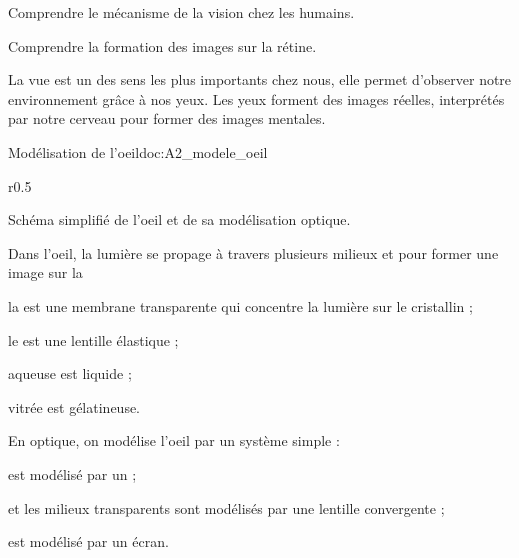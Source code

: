 \tetePremStssVisi
{}

\begin{objectifs}
  \item Comprendre le mécanisme de la vision chez les humains.
  \item Comprendre la formation des images sur la rétine.
\end{objectifs}

\begin{contexte}
  La vue est un des sens les plus importants chez nous, elle permet d'observer notre environnement grâce à nos yeux.
  Les yeux forment des images réelles, interprétés par notre cerveau pour former des images mentales.
  
\end{contexte}

\begin{doc}{Modélisation de l'oeil}{doc:A2_modele_oeil}  
  \begin{wrapfigure}{r}{0.5\linewidth}
    \vspace*{-30pt}
    \centering

    \vspace*{-12pt}
    \small{Schéma simplifié de l'oeil et de sa modélisation optique.}
  \end{wrapfigure}

  Dans l'oeil, la lumière se propage à travers plusieurs milieux  et  pour former une image sur la 
  \begin{listePoints}
    \item la  est une membrane transparente qui concentre la lumière sur le cristallin ;
    \item le  est une lentille élastique ;
    \item {} aqueuse est liquide ;
    \item {} vitrée est gélatineuse.
  \end{listePoints}

  En optique, on modélise l'oeil par un système simple :
  \begin{listePoints}
    \item {} est modélisé par un  ;
    \item {} et les milieux transparents sont modélisés par une lentille convergente ;
    \item {} est modélisé par un écran.
  \end{listePoints}
\end{doc}

